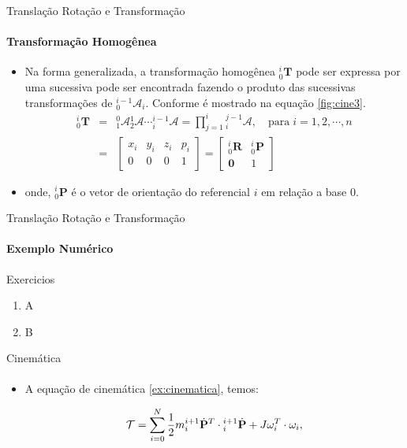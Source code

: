 \documentclass{beamer}
\begin{document}
\begin{frame}{{Translação Rotação e Transformação}}
    \framesubtitle{Transformação Homogênea}
    \begin{itemize}
        \item Na forma generalizada, a transformação homogênea ${}^{i}_0\mathbf{T}$ pode ser expressa por uma sucessiva pode ser encontrada fazendo o produto das sucessivas transformações de ${}^{i-1}_0\mathcal{A}_i$. Conforme é mostrado na equação \eqref{fig:cine3}.
        \begin{equation}\label{fig:cine3}
        \begin{array}{lcl}
        {}^i_0\mathbf{T} &= & {}^0_1\mathcal{A}{}^1_2\mathcal{A} \cdots {}^{i-1}_i\mathcal{A} = \prod \limits^i_{j=1}{}^{j-1}_i\mathcal{A}, \quad \mathrm{para\;}i=1,2,\cdots,n\\[.2cm]
        & = &
        \begin{bmatrix}
        x_i & y_i & z_i & p_i\\
        0 & 0 & 0 & 1
        \end{bmatrix} = 
        \begin{bmatrix}
        {}^i_0\mathbf{R} & {}^i_0\mathbf{P}\\
        \mathbf{0} & 1
        \end{bmatrix}
        \end{array}
        \end{equation}      
        \item onde, ${}^i_0\mathbf{P}$ é o vetor de orientação do referencial $i$ em relação a base $0$.
    \end{itemize}

\end{frame}

\begin{frame}{{Translação Rotação e Transformação}}
\framesubtitle{Exemplo Numérico}

\end{frame}

\begin{frame}{Exercicios}
    \begin{enumerate}
        \item A
        \item B
    \end{enumerate}
\end{frame}


\begin{frame}{{Cinemática}}
    \framesubtitle{}
    \begin{itemize}
        \item A equação de cinemática  \ref{ex:cinematica}, temos:

        \begin{equation}
        \mathcal{T} = \sum\limits_{i=0}^{N} \frac{1}{2} m {}_{i}^{i+1} \dot{\mathbf{P}}^T \cdot {}_{i}^{i+1}\dot{\mathbf{P}}+ J\boldmath{\omega}_i^T\cdot \boldmath{\omega}_i,
        \end{equation}
    \end{itemize}
\end{frame}
\end{document}
